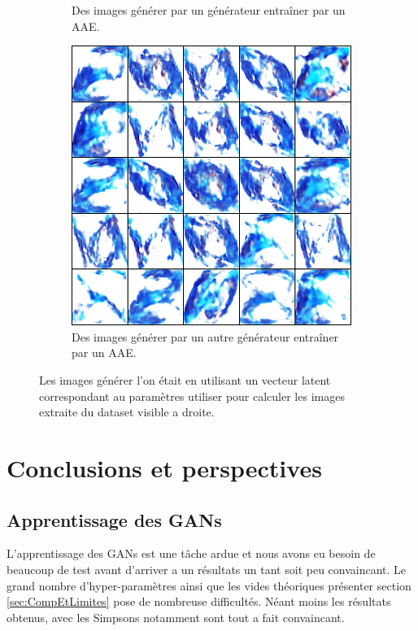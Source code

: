 \documentclass[11pt,francais]{article}
\begin{document}
\begin{figure}[!h]
\begin{subfigure}[b]{0.32\textwidth}
        \caption{Des images générer par un générateur entraîner par un AAE.}
    \end{subfigure}
    \begin{subfigure}[b]{0.32\textwidth}
        \includegraphics[width=\textwidth]{Figures/ComparaisonLS/scan8_eps0,1_lrelu1e06_0.png}
        \caption{Des images générer par un autre générateur entraîner par un AAE.}
    \end{subfigure}
    \caption{Les images générer l'on était en utilisant un vecteur latent correspondant au paramètres utiliser pour calculer les images extraite du dataset visible a droite.}
    \label{fig:fig8}
\end{figure}

\section{Conclusions et perspectives}
\label{sec:Conclusion}

\subsection{Apprentissage des GANs}
L'apprentissage des GANs est une tâche ardue et nous avons eu besoin de beaucoup de test avant d'arriver a un résultats un tant soit peu convaincant. Le grand nombre d'hyper-paramètres ainsi que les vides théoriques présenter section \ref{sec:CompEtLimites} pose de nombreuse difficultés. Néant moins les résultats obtenus, avec les Simpsons notamment sont tout a fait convaincant.
\end{document}
